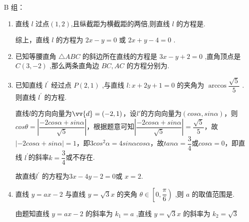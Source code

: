 B 组：
\begin{enumerate}
    \item 直线 $l$ 过点$(1,2)$,且纵截距为横截距的两倍,则直线 $l$ 的方程是.
    \begin{jieda}
        综上，直线 $l$ 的方程为 ${2x} - y = 0$ 或 ${2x} + y - 4 = 0$ .
    \end{jieda}
    
    \item 已知等腰直角 $\bigtriangleup  {ABC}$ 的斜边所在直线的方程是 ${3x} - y + 2 = 0$ ,直角顶点是 $C\left( {3, - 2}\right)$ ,那么两条直角边 ${BC},{AC}$ 的方程分别为.

     \item 已知直线 ${l}^{\prime }$ 经过点 $P\left( {2,1}\right)$ ,与直线 $l : x + {2y} + 1 = 0$ 的夹角为 $\arccos \dfrac{\sqrt{5}}{5}$ . 则直线 ${l}^{\prime }$ 的方程.
    \begin{jieda}
        直线$l$的方向向量为$\vv{d} = (-2, 1)$，设$l'$的方向向量为$(cos\alpha, sin\alpha)$，则$cos\theta = \left|\dfrac{-2cos\alpha+sin\alpha}{\sqrt{5}}\right|$，根据题意可知$\left|\dfrac{-2cos\alpha+sin\alpha}{\sqrt{5}}\right| = \dfrac{\sqrt{5}}{5}$，故$\left|-2cos\alpha+sin\alpha\right| = 1$，即$3cos^2\alpha = 4sin\alpha cos\alpha$，故$tan\alpha = \dfrac{3}{4}$或$cos\alpha = 0$，即直线 ${l}^{\prime }$的斜率$k = \dfrac{3}{4}$或不存在.

        故直线${l}^{\prime }$ 的方程为${3x} - {4y} - 2 = 0$或 $x = 2$.
    \end{jieda}

    \item 直线 $y = {ax} - 2$ 与直线 $y = \sqrt{3}x$ 的夹角 $\theta  \in  \left\lbrack  {0,\dfrac{\pi }{6}}\right)$ ,则 $a$ 的取值范围是.
    \begin{jieda}
        由题知直线 $y = {ax} - 2$ 的斜率为 ${k}_{1} = a$ ,直线 $y = \sqrt{3}x$ 的斜率为 ${k}_{2} = \sqrt{3}$
        

\end{jieda}
\end{enumerate}
